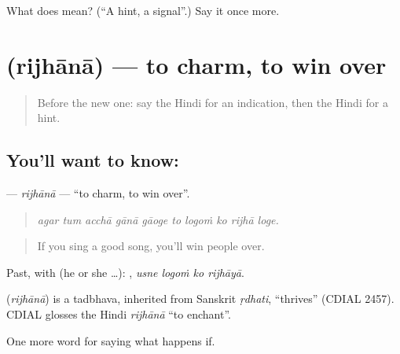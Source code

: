 \begin{tcolorbox}[breakable,colback=teal!4,colframe=teal!35!black,title={Before you move on}]
What does  mean? (\textquotedblleft{}A hint, a signal\textquotedblright{}.) Say it once more.
\end{tcolorbox}
\section[\texorpdfstring{\hi{रिझाना} (rijhānā)}{रिझाना (rijhānā)}]{ (rijhānā) — to charm, to win over}

\label{lesson:HI-C375-rijhana}



\begin{quote}
Before the new one: say the Hindi for an indication, then the Hindi for a hint.
\end{quote}

\subsection*{You'll want to know: }
\textbf{} — \emph{rijhānā} — \textquotedblleft{}to charm, to win over\textquotedblright{}.

\begin{quote}
         
\end{quote}

\begin{quote}
\emph{agar tum acchā gānā gāoge to logoṁ ko rijhā loge.}
\end{quote}

\begin{quote}
If you sing a good song, you'll win people over.
\end{quote}

Past, with  (he or she …):    , \emph{usne logoṁ ko rijhāyā}.

\begin{cousinweb}
\textbf{} (\emph{rijhānā}) is a tadbhava, inherited from Sanskrit \emph{ṛdhati}, \textquotedblleft{}thrives\textquotedblright{} (CDIAL 2457). CDIAL glosses the Hindi \emph{rijhānā} \textquotedblleft{}to enchant\textquotedblright{}.
\end{cousinweb}

\begin{grammarlens}[title={What you've built}]
One more word for saying what happens if.
\end{grammarlens}


